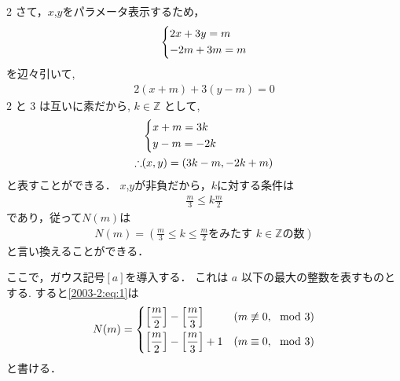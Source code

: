 \documentclass[../../main.tex]{subfiles}
\begin{document}
\begin{multicols}{2}
  さて，$x$,$y$をパラメータ表示するため，
  \begin{align*}
    \begin{dcases}
      2x+3y=m \\
      -2m+3m=m
    \end{dcases}
  \end{align*}
  を辺々引いて,
  \begin{align*}
    2(x+m)+3(y-m)=0
  \end{align*}
  $2$ と $3$ は互いに素だから, $k \in \mathbb{Z}$ として,
  \begin{align*}
     & \begin{dcases}
         x+m = 3k \\
         y-m = -2k
       \end{dcases}         \\
    \therefore
     & (x,y) = (3k-m, -2k+m)
  \end{align*}
  と表すことができる．
  $x$,$y$が非負だから，$k$に対する条件は
  \begin{align*}
    \frac{m}{3} \le k \frac{m}{2}
  \end{align*}
  であり，従って$N(m)$は
  \begin{align}
    N(m) = \left(\frac{m}{3} \le k \le \frac{m}{2} \text{をみたす } k \in \mathbb{Z} \text{の数}\right) \label{2003-2:eq:1}
  \end{align}
  と言い換えることができる．

  ここで，ガウス記号$[a]$を導入する．
  これは $a$ 以下の最大の整数を表すものとする.
  すると\cref{2003-2:eq:1}は
  \begin{align}
    N(m) =
    \begin{dcases}
      \left[\frac{m}{2}\right] - \left[\frac{m}{3}\right]     & (m \not\equiv 0, \mod 3) \\
      \left[\frac{m}{2}\right] - \left[\frac{m}{3}\right] + 1 & (m \equiv 0, \mod 3)
    \end{dcases}  \label{2003-2:eq:4}
  \end{align}
  と書ける．


\end{multicols}
\end{document}
